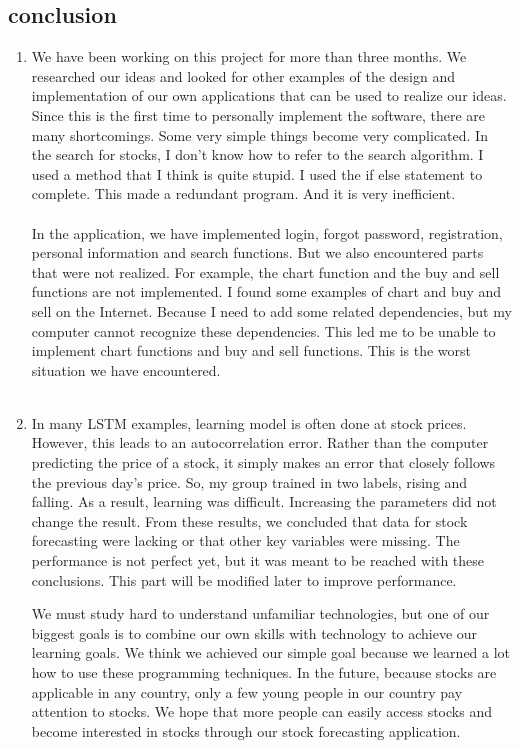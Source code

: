 \documentclass[conference]{IEEEtran}
\begin{document}
\subsection{conclusion}
\begin{enumerate}
      
    
    \item We have been working on this project for more than three months. We researched our ideas and looked for other examples of the design and implementation of our own applications that can be used to realize our ideas. Since this is the first time to personally implement the software, there are many shortcomings. Some very simple things become very complicated. In the search for stocks, I don’t know how to refer to the search algorithm. I used a method that I think is quite stupid. I used the if else statement to complete. This made a redundant program. And it is very inefficient.
    \\\\
    
 In the application, we have implemented login, forgot password, registration, personal information and search functions. But we also encountered parts that were not realized. For example, the chart function and the buy and sell functions are not implemented. I found some examples of chart and buy and sell on the Internet. Because I need to add some related dependencies, but my computer cannot recognize these dependencies. This led me to be unable to implement chart functions and buy and sell functions. This is the worst situation we have encountered.\\\\
    
    \item  In many LSTM examples, learning model is often done at stock prices. However, this leads to an autocorrelation error. Rather than the computer predicting the price of a stock, it simply makes an error that closely follows the previous day's price. So, my group trained in two labels, rising and falling. As a result, learning was difficult. Increasing the parameters did not change the result. From these results, we concluded that data for stock forecasting were lacking or that other key variables were missing. The performance is not perfect yet, but it was meant to be reached with these conclusions. This part will be modified later to improve performance.\vspace{1\baselineskip}
    
      We must study hard to understand unfamiliar technologies, but one of our biggest goals is to combine our own skills with technology to achieve our learning goals. We think we achieved our simple goal because we learned a lot how to use these programming techniques. In the future, because stocks are applicable in any country, only a few young people in our country pay attention to stocks. We hope that more people can easily access stocks and become interested in stocks through our stock forecasting application.
    
    
      
    
\end{enumerate}
\end{document}
